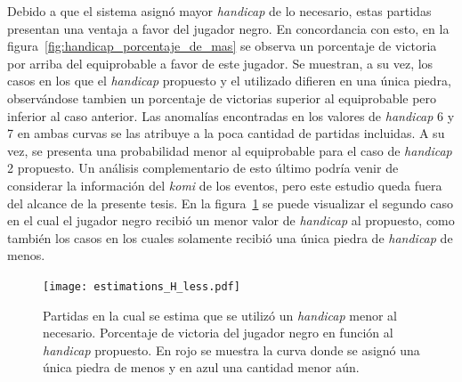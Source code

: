 \documentclass[11pt,twoside,spanish]{report} %
\begin{document}
Debido a que el sistema asign\'o mayor \textit{handicap} de lo necesario,  estas partidas presentan una ventaja a favor del jugador negro.
En concordancia con esto, en la figura~\ref{fig:handicap_porcentaje_de_mas} se observa un porcentaje de victoria por arriba del equiprobable a favor de este jugador.
Se muestran, a su vez, los casos en los que el \textit{handicap} propuesto y el utilizado difieren en una \'unica piedra, observ\'andose tambien un porcentaje de victorias superior al equiprobable pero inferior al caso anterior.
Las anomal\'ias encontradas en los valores de \textit{handicap} 6 y 7 en ambas curvas se las atribuye a la poca cantidad de partidas incluidas.
A su vez, se presenta una probabilidad menor al equiprobable para el caso de \textit{handicap} 2 propuesto.
Un an\'alisis complementario de esto \'ultimo podr\'ia venir de considerar la informaci\'on del \textit{komi} de los eventos, pero este estudio queda fuera del alcance de la presente tesis.
En la figura~\ref{fig:handicap_porcentaje_de_menos} se puede visualizar el segundo caso en el cual el jugador negro recibi\'o un menor valor de \textit{handicap} al propuesto, como tambi\'en los casos en los cuales solamente recibi\'o una \'unica piedra de \textit{handicap} de menos.



\begin{figure}[H]
    \centering
    \texttt{[image: estimations\_H\_less.pdf]}
    \caption{Partidas en la cual se estima que se utiliz\'o un \textit{handicap} menor al necesario. Porcentaje de victoria del jugador negro en funci\'on al \textit{handicap} propuesto.  En rojo se muestra la curva donde se asign\'o  una \'unica piedra de menos  y en azul una cantidad menor a\'un.}
    \label{fig:handicap_porcentaje_de_menos}
\end{figure}
\end{document}
